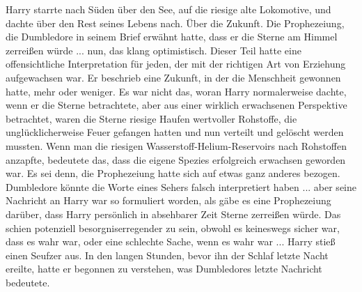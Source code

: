 Harry starrte nach Süden über den See, auf die riesige alte Lokomotive, und
dachte über den Rest seines Lebens nach. Über die Zukunft. Die Prophezeiung, die
Dumbledore in seinem Brief erwähnt hatte, dass er die Sterne am Himmel zerreißen
würde ... nun, das klang optimistisch. Dieser Teil hatte eine offensichtliche
Interpretation für jeden, der mit der richtigen Art von Erziehung aufgewachsen
war. Er beschrieb eine Zukunft, in der die Menschheit gewonnen hatte, mehr oder
weniger. Es war nicht das, woran Harry normalerweise dachte, wenn er die Sterne
betrachtete, aber aus einer wirklich erwachsenen Perspektive betrachtet, waren
die Sterne riesige Haufen wertvoller Rohstoffe, die unglücklicherweise Feuer
gefangen hatten und nun verteilt und gelöscht werden mussten. Wenn man die
riesigen Wasserstoff-Helium-Reservoirs nach Rohstoffen anzapfte, bedeutete das,
dass die eigene Spezies erfolgreich erwachsen geworden war. Es sei denn, die
Prophezeiung hatte sich auf etwas ganz anderes bezogen. Dumbledore könnte die
Worte eines Sehers falsch interpretiert haben ... aber seine Nachricht an Harry
war so formuliert worden, als gäbe es eine Prophezeiung darüber, dass Harry
persönlich in absehbarer Zeit Sterne zerreißen würde. Das schien potenziell
besorgniserregender zu sein, obwohl es keineswegs sicher war, dass es wahr war,
oder eine schlechte Sache, wenn es wahr war ... Harry stieß einen Seufzer aus. In
den langen Stunden, bevor ihn der Schlaf letzte Nacht ereilte, hatte er begonnen
zu verstehen, was Dumbledores letzte Nachricht bedeutete.

